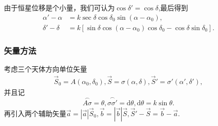 \documentclass[11pt, a4paper, oneside]{ctexart}
\numberwithin{equation}{subsection}
\begin{document}
由于恒星位移是个小量，我们可认为$\cos\delta{}'=\cos\delta{}$,最后得到
\begin{align}
\alpha'-\alpha&=k\sec\delta{}\cos\delta{}_{0}\sin\left(\alpha-\alpha_{0}\right),\label{1.1.24}\\
\delta{}'-\delta{}&=k\left[\sin\delta{}\cos\left(\alpha-\alpha_{0}\right)\cos\delta{}_{0}-\cos\delta{}\sin\delta{}_{0}\right].\label{1.1.25}
\end{align}

\subsubsection{矢量方法}
考虑三个天体方向单位矢量
\begin{align}
\vec{S}_{0}=A\left(\alpha_{0},\delta{}_{0}\right),\vec{S}=\sigma\left(\alpha,\delta{}\right),\vec{S}'=\sigma'\left(\alpha',\delta{}'\right),
\end{align}
并且记
\begin{equation}
\overset{\frown}{A\sigma}=\theta,\overset{\frown}{\sigma\sigma'}=\mathrm{d}\theta,\mathrm{d}\theta=k\sin\theta.
\end{equation}
再引入两个辅助矢量$\vec{a}=\left\vert{}\vec{a}\right\vert{}\vec{S}_{0},\vec{b}=\left\vert{}\vec{b}\right\vert{}\vec{S},\vec{S}'-\vec{S}=\vec{b}-\vec{a}$.
\end{document}
